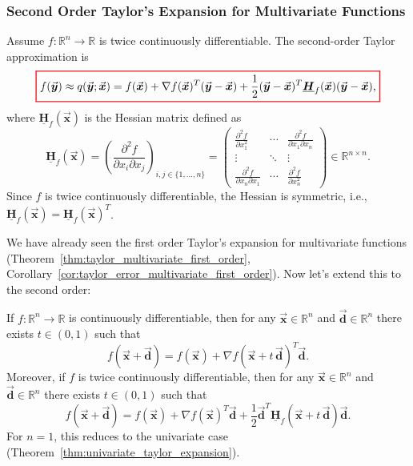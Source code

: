 \documentclass[9pt, headings=standardclasses, parskip=half]{scrartcl}
\newcommand{\matr}[1]{\underline{\boldsymbol{#1}}}
\newcommand{\vect}[1]{\vec{\boldsymbol{#1}}}
\begin{document}
\subsubsection{Second Order Taylor's Expansion for Multivariate Functions}
\label{subsubsec:second_order_taylor_multivariate}
Assume \(f:\mathbb{R}^{n}\to\mathbb{R}\) is twice continuously differentiable. The second-order Taylor approximation is
\begin{equation}
\label{eq:second_order_taylor_approximation_multivariate}
{\color{Red}
\setlength{\fboxrule}{1pt}
\boxed{ 
\color{black}
f(\vect{y})\approx q(\vect{y};\vect{x})=f(\vect{x})+\nabla f(\vect{x})^{T}(\vect{y}-\vect{x})+\frac{1}{2}(\vect{y}-\vect{x})^{T}\matr{H}_{f}(\vect{x})(\vect{y}-\vect{x}) \text{,}
}
}
\end{equation}
where \(\matr{H}_{f}(\vect{x})\) is the Hessian matrix defined as 
\[
\matr{H}_{f}(\vect{x})
=
\left(\frac{\partial^{2}f}{\partial x_{i}\partial x_{j}}\right)_{i,j \in \{1,\ldots,n\}}
=
\begin{pmatrix}
\frac{\partial^{2}f}{\partial x_{1}^{2}} & \cdots & \frac{\partial^{2}f}{\partial x_{1}\partial x_{n}} \\
\vdots & \ddots & \vdots \\
\frac{\partial^{2}f}{\partial x_{n}\partial x_{1}} & \cdots & \frac{\partial^{2}f}{\partial x_{n}^{2}}
\end{pmatrix}
\in \mathbb{R}^{n \times n} \text{.}
\]
Since \(f\) is twice continuously differentiable, the Hessian is symmetric, i.e., \(\matr{H}_{f}(\vect{x})=\matr{H}_{f}(\vect{x})^{T}\).

We have already seen the first order Taylor's expansion for multivariate functions (Theorem~\ref{thm:taylor_multivariate_first_order}, Corollary~\ref{cor:taylor_error_multivariate_first_order}). 
Now let's extend this to the second order:
\begin{theorem}
  \label{thm:multivariate_taylor_expansion_second}
  If \(f:\mathbb{R}^{n}\to\mathbb{R}\) is continuously differentiable, then for any \(\vect{x}\in\mathbb{R}^{n}\) and \(\vect{d}\in\mathbb{R}^{n}\) there exists \(t\in (0,1)\) such that
  \[
  f(\vect{x}+\vect{d})=f(\vect{x})+\nabla f(\vect{x}+t\,\vect{d})^{T}\vect{d} \text{.}
  \]
  Moreover, if \(f\) is twice continuously differentiable, then for any \(\vect{x}\in\mathbb{R}^{n}\) and \(\vect{d}\in\mathbb{R}^{n}\) there exists \(t\in (0,1)\) such that
  \[
  f(\vect{x}+\vect{d})=f(\vect{x})+\nabla f(\vect{x})^{T}\vect{d}+\frac{1}{2}\vect{d}^{T}\matr{H}_{f}(\vect{x}+t\,\vect{d})\vect{d} \text{.}
  \]
  For \(n = 1\), this reduces to the univariate case (Theorem~\ref{thm:univariate_taylor_expansion}).
\end{theorem}
\end{document}
